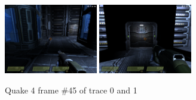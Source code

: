 \documentclass[pageno]{jpaper}
\begin{document}
 \begin{figure}[!t]
\centering
\includegraphics[width=1.6in]{pics/quakeFrame90.png}
\includegraphics[width=1.6in]{pics/quakeFrame91.png}
\caption{Quake 4 frame \#45 of trace 0 and 1}
\label{fig:quakeFrames}
\end{figure}
\end{document}
